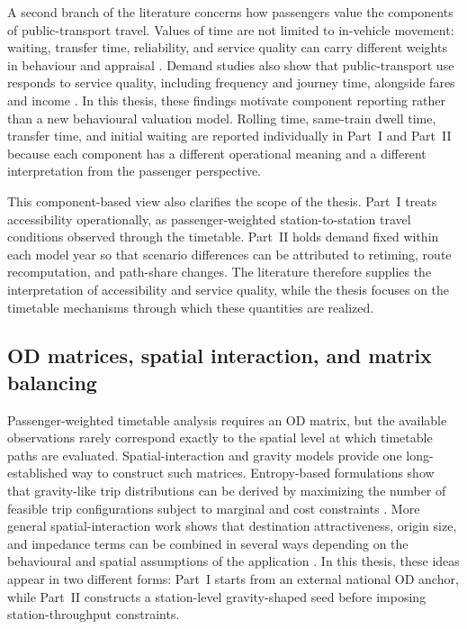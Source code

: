 \documentclass[preprint,12pt]{elsarticle}
\begin{document}
A second branch of the literature concerns how passengers value the components of public-transport travel. Values of time are not limited to in-vehicle movement: waiting, transfer time, reliability, and service quality can carry different weights in behaviour and appraisal \citep{wardman2004values}. Demand studies also show that public-transport use responds to service quality, including frequency and journey time, alongside fares and income \citep{paulley2006demand}. In this thesis, these findings motivate component reporting rather than a new behavioural valuation model. Rolling time, same-train dwell time, transfer time, and initial waiting are reported individually in Part~I and Part~II because each component has a different operational meaning and a different interpretation from the passenger perspective.

This component-based view also clarifies the scope of the thesis. Part~I treats accessibility operationally, as passenger-weighted station-to-station travel conditions observed through the timetable. Part~II holds demand fixed within each model year so that scenario differences can be attributed to retiming, route recomputation, and path-share changes. The literature therefore supplies the interpretation of accessibility and service quality, while the thesis focuses on the timetable mechanisms through which these quantities are realized.

\subsection{OD matrices, spatial interaction, and matrix balancing}\label{sec:reviewodmatrices}

Passenger-weighted timetable analysis requires an OD matrix, but the available observations rarely correspond exactly to the spatial level at which timetable paths are evaluated. Spatial-interaction and gravity models provide one long-established way to construct such matrices. Entropy-based formulations show that gravity-like trip distributions can be derived by maximizing the number of feasible trip configurations subject to marginal and cost constraints \citep{wilson1970entropy}. More general spatial-interaction work shows that destination attractiveness, origin size, and impedance terms can be combined in several ways depending on the behavioural and spatial assumptions of the application \citep{fotheringham1983CompetingDestinations}. In this thesis, these ideas appear in two different forms: Part~I starts from an external national OD anchor, while Part~II constructs a station-level gravity-shaped seed before imposing station-throughput constraints.
\end{document}
